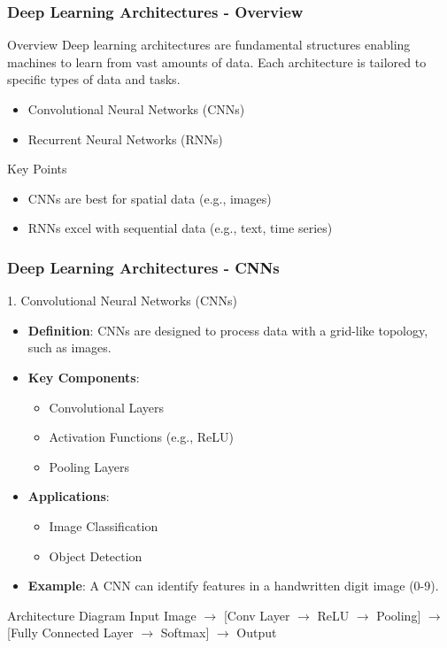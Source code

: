 \documentclass{beamer}
\begin{document}
\begin{frame}[fragile]
    \frametitle{Deep Learning Architectures - Overview}
    \begin{block}{Overview}
        Deep learning architectures are fundamental structures enabling machines to learn from vast amounts of data. Each architecture is tailored to specific types of data and tasks.
    \end{block}
    \begin{itemize}
        \item Convolutional Neural Networks (CNNs)
        \item Recurrent Neural Networks (RNNs)
    \end{itemize}
    \begin{block}{Key Points}
        \begin{itemize}
            \item CNNs are best for spatial data (e.g., images)
            \item RNNs excel with sequential data (e.g., text, time series)
        \end{itemize}
    \end{block}
\end{frame}

\begin{frame}[fragile]
    \frametitle{Deep Learning Architectures - CNNs}
    \begin{block}{1. Convolutional Neural Networks (CNNs)}
        \begin{itemize}
            \item \textbf{Definition}: CNNs are designed to process data with a grid-like topology, such as images.
            \item \textbf{Key Components}:
            \begin{itemize}
                \item Convolutional Layers
                \item Activation Functions (e.g., ReLU)
                \item Pooling Layers
            \end{itemize}
            \item \textbf{Applications}:
            \begin{itemize}
                \item Image Classification
                \item Object Detection
            \end{itemize}
            \item \textbf{Example}: A CNN can identify features in a handwritten digit image (0-9).
        \end{itemize}
    \end{block}
    \begin{block}{Architecture Diagram}
        Input Image $\rightarrow$ [Conv Layer $\rightarrow$ ReLU $\rightarrow$ Pooling] $\rightarrow$ [Fully Connected Layer $\rightarrow$ Softmax] $\rightarrow$ Output
    \end{block}
\end{frame}
\end{document}

